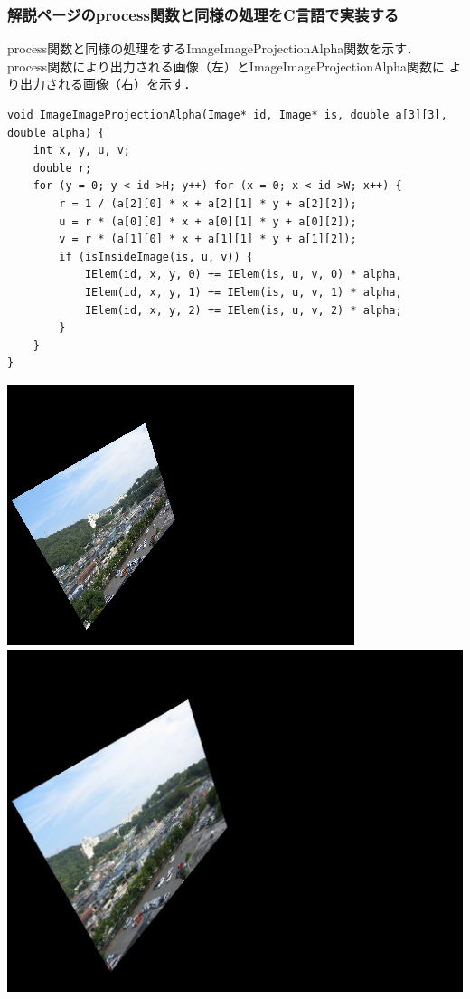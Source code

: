 \documentclass[11pt]{jarticle}
\begin{document}
\subsubsection{解説ページのprocess関数と同様の処理をC言語で実装する}

process関数と同様の処理をするImageImageProjectionAlpha関数を示す．
process関数により出力される画像（左）とImageImageProjectionAlpha関数に
より出力される画像（右）を示す．

\begin{lstlisting}
void ImageImageProjectionAlpha(Image* id, Image* is, double a[3][3], double alpha) {
    int x, y, u, v;
    double r;
    for (y = 0; y < id->H; y++) for (x = 0; x < id->W; x++) {
        r = 1 / (a[2][0] * x + a[2][1] * y + a[2][2]);
        u = r * (a[0][0] * x + a[0][1] * y + a[0][2]);
        v = r * (a[1][0] * x + a[1][1] * y + a[1][2]);
        if (isInsideImage(is, u, v)) {
            IElem(id, x, y, 0) += IElem(is, u, v, 0) * alpha,
            IElem(id, x, y, 1) += IElem(is, u, v, 1) * alpha,
            IElem(id, x, y, 2) += IElem(is, u, v, 2) * alpha;
        }
    }
}
\end{lstlisting}

\includegraphics[scale=.6]{./img/dai2js.png}
\includegraphics[scale=.3]{./img/c_henkan.jpg}
\end{document}
